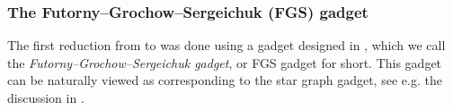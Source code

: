 

\subsubsection{The Futorny--Grochow--Sergeichuk (FGS) gadget}\label{sec:FGS}

The first reduction from \pTI to \TI was done using a gadget designed in \cite{FGS19}, which we call the \emph{Futorny--Grochow--Sergeichuk gadget}, or FGS gadget for short. This gadget can be naturally viewed as corresponding to the star graph gadget, see e.g. the discussion in \cite[Sec.~3]{TI2}.

